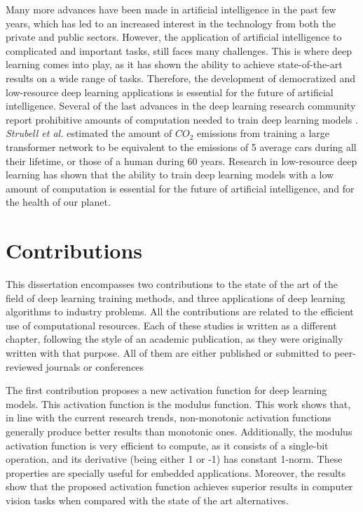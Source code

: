 Many more advances have been made in artificial intelligence in the past few years, which has led to an increased interest in the technology from both the private and public sectors. However, the application of artificial intelligence to complicated and important tasks, still faces many challenges. This is where deep learning comes into play, as it has shown the ability to achieve state-of-the-art results on a wide range of tasks. Therefore, the development of democratized and low-resource deep learning applications is essential for the future of artificial intelligence. Several of the last advances in the deep learning research community report prohibitive amounts of computation needed to train deep learning models \cite{silver2016, kechyn2018, brown2020, floridi2020}. \textit{Strubell et al.} \cite{strubell2019} estimated the amount of $CO_2$ emissions from training a large transformer network to be equivalent to the emissions of 5 average cars during all their lifetime, or those of a human during 60 years. Research in low-resource deep learning \cite{howard2017, Han2017, Gao2018, sanchez2020, so2021} has shown that the ability to train deep learning models with a low amount of computation is essential for the future of artificial intelligence, and for the health of our planet.


\section{Contributions}
This dissertation encompasses two contributions to the state of the art of the field of deep learning training methods, and three applications of deep learning algorithms to industry problems. All the contributions are related to the efficient use of computational resources. Each of these studies is written as a different chapter, following the style of an academic publication, as they were originally written with that purpose. All of them are either published or submitted to peer-reviewed journals or conferences

The first contribution proposes a new activation function for deep learning models. This activation function is the modulus function. This work shows that, in line with the current research trends, non-monotonic activation functions generally produce better results than monotonic ones. Additionally, the modulus activation function is very efficient to compute, as it consists of a single-bit operation, and its derivative (being either 1 or -1) has constant 1-norm. These properties are specially useful for embedded applications. Moreover, the results show that the proposed activation function achieves superior results in computer vision tasks when compared with the state of the art alternatives. 

